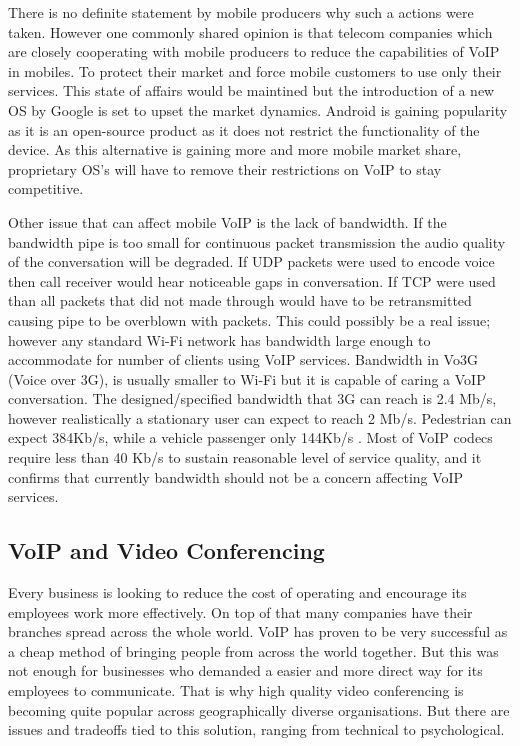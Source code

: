 There is no definite statement by mobile producers why such a actions were taken. However one commonly shared opinion is that telecom companies which are closely cooperating with mobile producers to reduce the capabilities of VoIP in mobiles. To protect their market and force mobile customers to use only their services. This state of affairs would be maintined but the introduction of a new OS by Google is set to upset the market dynamics. Android is gaining popularity as it is an open-source product as it does not restrict the functionality of the device. As this alternative is gaining more and more mobile market share, proprietary OS's will have to remove their restrictions on VoIP to stay competitive.

Other issue that can affect mobile VoIP is the lack of bandwidth. If the bandwidth pipe is too small for continuous packet transmission the audio quality of the conversation will be degraded. If UDP packets were used to encode voice then call receiver would hear noticeable gaps in conversation. If TCP were used than all packets that did not made through would have to be retransmitted causing pipe to be overblown with packets. This could possibly be a real issue; however any standard Wi-Fi network has bandwidth large enough to accommodate for number of clients using VoIP services. Bandwidth in Vo3G (Voice over 3G), is usually smaller to Wi-Fi but it is capable of caring a VoIP conversation. The designed/specified bandwidth that 3G can reach is 2.4 Mb/s, however realistically a stationary user can expect to reach 2 Mb/s. Pedestrian can expect 384Kb/s, while a vehicle passenger only 144Kb/s \cite{website:3g_spec}. Most of VoIP codecs require less than 40 Kb/s to sustain reasonable level of service quality\cite{website:voip_codecs}, and it confirms that currently bandwidth should not be a concern affecting VoIP services.

\subsection{VoIP and Video Conferencing}
Every business is looking to reduce the cost of operating and encourage its employees work more effectively. On top of that many companies have their branches spread across the whole world. VoIP has proven to be very successful as a cheap method of bringing people from across the world together. But this was not enough for businesses who demanded a easier and more direct way for its employees to communicate. That is why high quality video conferencing is becoming quite popular across geographically diverse organisations. But there are issues and tradeoffs tied to this solution, ranging from technical to psychological\cite{website:vid_conf_voice_protocol_overview}.

